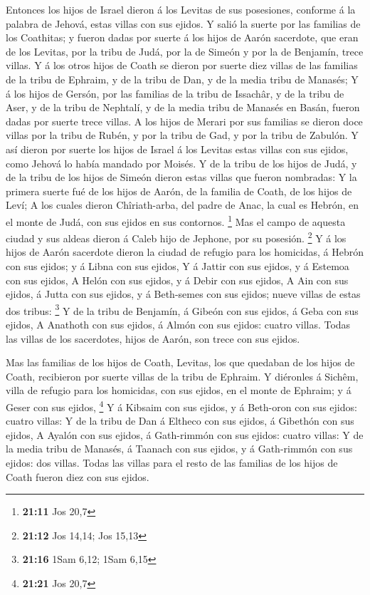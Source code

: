  Entonces los hijos de Israel dieron á los Levitas de sus
posesiones, conforme á la palabra de Jehová, estas villas con sus
ejidos.  Y salió la suerte por las familias de los
Coathitas; y fueron dadas por suerte á los hijos de Aarón sacerdote, que
eran de los Levitas, por la tribu de Judá, por la de Simeón y por la de
Benjamín, trece villas.  Y á los otros hijos de Coath se
dieron por suerte diez villas de las familias de la tribu de Ephraim, y
de la tribu de Dan, y de la media tribu de Manasés;  Y á
los hijos de Gersón, por las familias de la tribu de Issachâr, y de la
tribu de Aser, y de la tribu de Nephtalí, y de la media tribu de Manasés
en Basán, fueron dadas por suerte trece villas.  A los
hijos de Merari por sus familias se dieron doce villas por la tribu de
Rubén, y por la tribu de Gad, y por la tribu de Zabulón. 
Y así dieron por suerte los hijos de Israel á los Levitas estas villas
con sus ejidos, como Jehová lo había mandado por Moisés. 
Y de la tribu de los hijos de Judá, y de la tribu de los hijos de Simeón
dieron estas villas que fueron nombradas:  Y la primera
suerte fué de los hijos de Aarón, de la familia de Coath, de los hijos
de Leví;  A los cuales dieron Chîriath-arba, del padre de
Anac, la cual es Hebrón, en el monte de Judá, con sus ejidos en sus
contornos. \footnote{\textbf{21:11} Jos 20,7}  Mas el
campo de aquesta ciudad y sus aldeas dieron á Caleb hijo de Jephone, por
su posesión. \footnote{\textbf{21:12} Jos 14,14; Jos 15,13}
 Y á los hijos de Aarón sacerdote dieron la ciudad de
refugio para los homicidas, á Hebrón con sus ejidos; y á Libna con sus
ejidos,  Y á Jattir con sus ejidos, y á Estemoa con sus
ejidos,  A Helón con sus ejidos, y á Debir con sus
ejidos,  A Ain con sus ejidos, á Jutta con sus ejidos, y
á Beth-semes con sus ejidos; nueve villas de estas dos tribus:
\footnote{\textbf{21:16} 1Sam 6,12; 1Sam 6,15}  Y de la
tribu de Benjamín, á Gibeón con sus ejidos, á Geba con sus ejidos,
 A Anathoth con sus ejidos, á Almón con sus ejidos:
cuatro villas.  Todas las villas de los sacerdotes, hijos
de Aarón, son trece con sus ejidos.

 Mas las familias de los hijos de Coath, Levitas, los que
quedaban de los hijos de Coath, recibieron por suerte villas de la tribu
de Ephraim.  Y diéronles á Sichêm, villa de refugio para
los homicidas, con sus ejidos, en el monte de Ephraim; y á Geser con sus
ejidos, \footnote{\textbf{21:21} Jos 20,7}  Y á Kibsaim
con sus ejidos, y á Beth-oron con sus ejidos: cuatro villas:
 Y de la tribu de Dan á Eltheco con sus ejidos, á
Gibethón con sus ejidos,  A Ayalón con sus ejidos, á
Gath-rimmón con sus ejidos: cuatro villas:  Y de la media
tribu de Manasés, á Taanach con sus ejidos, y á Gath-rimmón con sus
ejidos: dos villas.  Todas las villas para el resto de
las familias de los hijos de Coath fueron diez con sus ejidos.

